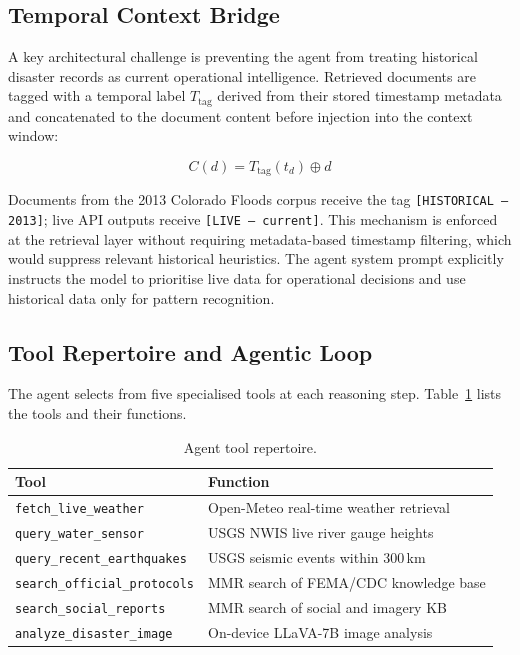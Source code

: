 \documentclass[conference]{IEEEtran}
\begin{document}
\subsection{Temporal Context Bridge}

A key architectural challenge is preventing the agent from treating historical
disaster records as current operational intelligence. Retrieved documents are
tagged with a temporal label $T_{\text{tag}}$ derived from their stored
timestamp metadata and concatenated to the document content before injection
into the context window:

\begin{equation}
  C(d) = T_{\text{tag}}(t_d) \oplus d
  \label{eq:tcb}
\end{equation}

Documents from the 2013 Colorado Floods corpus receive the tag
\texttt{[HISTORICAL -- 2013]}; live API outputs receive \texttt{[LIVE --
current]}. This mechanism is enforced at the retrieval layer without requiring
metadata-based timestamp filtering, which would suppress relevant historical
heuristics. The agent system prompt explicitly instructs the model to
prioritise live data for operational decisions and use historical data only
for pattern recognition.

\subsection{Tool Repertoire and Agentic Loop}

The agent selects from five specialised tools at each reasoning step.
Table~\ref{tab:tools} lists the tools and their functions.

\begin{table}[ht]
\centering
\caption{Agent tool repertoire.}
\label{tab:tools}
\renewcommand{\arraystretch}{1.2}
\begin{tabular}{@{}ll@{}}
\toprule
\textbf{Tool} & \textbf{Function} \\ \midrule
\texttt{fetch\_live\_weather}     & Open-Meteo real-time weather retrieval \\
\texttt{query\_water\_sensor}     & USGS NWIS live river gauge heights \\
\texttt{query\_recent\_earthquakes}& USGS seismic events within 300\,km \\
\texttt{search\_official\_protocols}& MMR search of FEMA/CDC knowledge base \\
\texttt{search\_social\_reports}  & MMR search of social and imagery KB \\
\texttt{analyze\_disaster\_image} & On-device LLaVA-7B image analysis \\ \bottomrule
\end{tabular}
\end{table}
\end{document}
